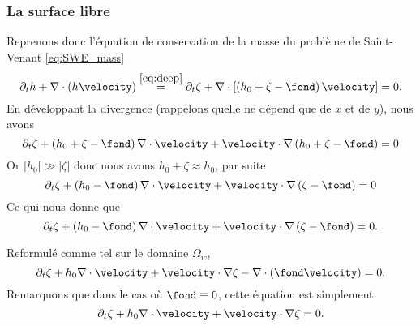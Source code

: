 \subsubsection{La surface libre}
\noindent Reprenons donc l'équation de conservation de la masse du problème de Saint-Venant \eqref{eq:SWE_mass}
\begin{equation}
	\partial_t h + \nabla\cdot \left(h\velocity\right) \overset{\eqref{eq:deep}}{=} \partial_t \zeta + \nabla \cdot\left[\left( h_0 + \zeta - \fond\right)\velocity\right] = 0.
\end{equation}
En développant la divergence (rappelons quelle ne dépend que de $x$ et de $y$), nous avons
\begin{equation}
	\partial_t \zeta + \left( h_0 + \zeta - \fond\right) \nabla \cdot\velocity + \velocity \cdot \nabla \left(h_0 + \zeta - \fond\right)  = 0
\end{equation}
Or $|h_0| \gg |\zeta|$ donc nous avons $h_0 + \zeta \approx h_0$, par suite 
\begin{equation}
\partial_t \zeta + \left( h_0 - \fond\right) \nabla \cdot\velocity + \velocity \cdot \nabla \left(\zeta - \fond\right) = 0\label{eq:massreecrite}
\end{equation}
Ce qui nous donne que
\begin{equation}
	\partial_t \zeta + \left( h_0 - \fond\right) \nabla \cdot\velocity + \velocity \cdot \nabla \left(\zeta-\fond\right) = 0.\label{eq:massreecriture}
\end{equation}
\begin{refe}
Reformulé comme tel sur le domaine $\Omega_w$,
\begin{equation}
\partial_t \zeta + h_0 \nabla \cdot\velocity + \velocity \cdot \nabla \zeta - \nabla \cdot \left(\fond\velocity\right) = 0.\label{eq:massreecriture2}
\end{equation}
\noindent Remarquons que dans le cas où $\fond \equiv 0$, cette équation est simplement
\begin{equation}
	\partial_t \zeta + h_0\nabla \cdot\velocity + \velocity \cdot \nabla \zeta = 0.
\end{equation}
\end{refe}


